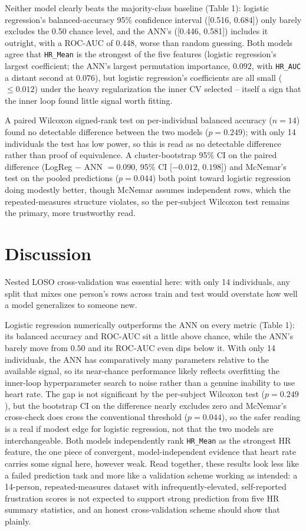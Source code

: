 \documentclass[11pt,a4paper]{article}
\begin{document}
Neither model clearly beats the majority-class baseline (Table 1): logistic regression's balanced-accuracy 95\% confidence interval ([0.516, 0.684]) only barely excludes the 0.50 chance level, and the ANN's ([0.446, 0.581]) includes it outright, with a ROC-AUC of 0.448, worse than random guessing. Both models agree that \texttt{HR\_Mean} is the strongest of the five features (logistic regression's largest coefficient; the ANN's largest permutation importance, $0.092$, with \texttt{HR\_AUC} a distant second at $0.076$), but logistic regression's coefficients are all small ($\leq 0.012$) under the heavy regularization the inner CV selected -- itself a sign that the inner loop found little signal worth fitting.

A paired Wilcoxon signed-rank test on per-individual balanced accuracy ($n=14$) found no detectable difference between the two models ($p=0.249$); with only 14 individuals the test has low power, so this is read as no detectable difference rather than proof of equivalence. A cluster-bootstrap 95\% CI on the paired difference (LogReg $-$ ANN $=0.090$, 95\% CI [$-0.012$, $0.198$]) and McNemar's test on the pooled predictions ($p=0.044$) both point toward logistic regression doing modestly better, though McNemar assumes independent rows, which the repeated-measures structure violates, so the per-subject Wilcoxon test remains the primary, more trustworthy read.

\section{Discussion}

Nested LOSO cross-validation was essential here: with only 14 individuals, any split that mixes one person's rows across train and test would overstate how well a model generalizes to someone new.

Logistic regression numerically outperforms the ANN on every metric (Table 1): its balanced accuracy and ROC-AUC sit a little above chance, while the ANN's barely move from $0.50$ and its ROC-AUC even dips below it. With only 14 individuals, the ANN has comparatively many parameters relative to the available signal, so its near-chance performance likely reflects overfitting the inner-loop hyperparameter search to noise rather than a genuine inability to use heart rate. The gap is not significant by the per-subject Wilcoxon test ($p=0.249$), but the bootstrap CI on the difference nearly excludes zero and McNemar's cross-check does cross the conventional threshold ($p=0.044$), so the safer reading is a real if modest edge for logistic regression, not that the two models are interchangeable. Both models independently rank \texttt{HR\_Mean} as the strongest HR feature, the one piece of convergent, model-independent evidence that heart rate carries some signal here, however weak. Read together, these results look less like a failed prediction task and more like a validation scheme working as intended: a 14-person, repeated-measures dataset with infrequently-elevated, self-reported frustration scores is not expected to support strong prediction from five HR summary statistics, and an honest cross-validation scheme should show that plainly.
\end{document}
